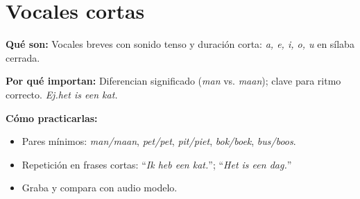 \section{Vocales cortas}
\textbf{Qué son:} Vocales breves con sonido tenso y duración corta: \textit{a, e, i, o, u} en sílaba cerrada.

\textbf{Por qué importan:} Diferencian significado (\textit{man} vs. \textit{maan}); clave para ritmo correcto. \textit{Ej.\@ het is een kat.}

\textbf{Cómo practicarlas:}
\begin{itemize}[leftmargin=*]
  \item Pares mínimos: \textit{man/maan}, \textit{pet/pet}, \textit{pit/piet}, \textit{bok/boek}, \textit{bus/boos}.
  \item Repetición en frases cortas: ``\textit{Ik heb een kat.}''; ``\textit{Het is een dag.}''
  \item Graba y compara con audio modelo.
\end{itemize}
